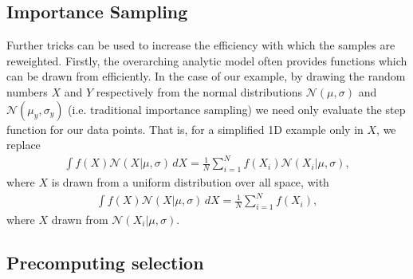 \documentclass[a4paper,fleqn,usenatbib]{mnras}
\begin{document}
\subsection{Importance Sampling}
Further tricks can be used to increase the efficiency with which the samples are reweighted. Firstly, the overarching analytic model often provides functions which can be drawn from efficiently. In the case of our example, by drawing the random numbers $X$ and $Y$ respectively from the normal distributions $\mathcal{N}(\mu,\sigma)$ and $\mathcal{N}(\mu_y,\sigma_y)$ (i.e. traditional importance sampling) we need only evaluate the step function for our data points. That is, for a simplified 1D example only in $X$, we replace
\begin{align}
\int f(X) \mathcal{N}(X|\mu,\sigma)\, dX = \frac{1}{N} \sum_{i=1}^N f(X_i) \mathcal{N}(X_i | \mu, \sigma),
\end{align}
where $X$ is drawn from a uniform distribution over all space, with 
\begin{align}
\int f(X) \mathcal{N}(X|\mu,\sigma)\, dX = \frac{1}{N} \sum_{i=1}^N f(X_i),
\end{align}
where $X$ drawn from $\mathcal{N}(X_i | \mu, \sigma)$.

\subsection{Precomputing selection}
\end{document}
